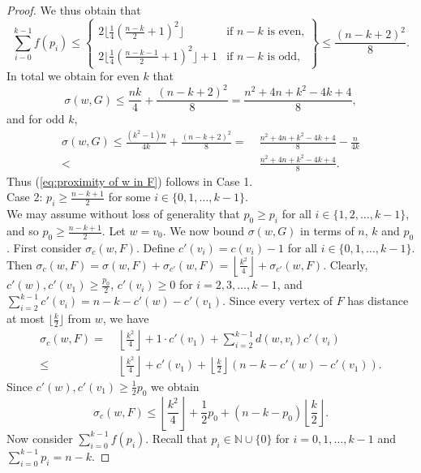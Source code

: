 \documentclass[a4paper,11pt]{article}
\numberwithin{equation}{theorem}
\begin{document}
\begin{proof}
We thus obtain that
\[ \sum_{i-0}^{k-1} f(p_i)  \leq 
   \left\{ \begin{array}{cc}
  2 \lfloor \frac{1}{4}(\frac{n-k}{2}+1)^2 \rfloor & 
  \textrm{if $n-k$ is even,} \\
 2 \lfloor \frac{1}{4}(\frac{n-k-1}{2}+1)^2 \rfloor + 1 & 
  \textrm{if $n-k$ is odd,} 
  \end{array} \right\} 
\leq \frac{(n-k+2)^2}{8}. \]
In total we obtain for even $k$ that
\[ \sigma(w,G) \leq \frac{nk}{4} 
 + \frac{(n-k+2)^2}{8}= 
\frac{n^2+4n + k^2 - 4k +4}{8},
\]
and for odd $k$, 
\begin{align*}
\sigma(w,G) \leq \frac{(k^2-1)n}{4k} 
 + \frac{(n-k+2)^2}{8}=&\; 
\frac{n^2+4n + k^2 - 4k +4}{8}-\frac{n}{4k}\\
<&\;\frac{n^2+4n + k^2 - 4k +4}{8}.
\end{align*}
Thus (\ref{eq:proximity of w in F}) follows in Case 1.\\[1mm]
{\sc Case 2:} $p_i \geq \frac{n-k+1}{2}$ for some $i \in \{0,1,\ldots,k-1\}$. \\
We may assume without loss of generality that $p_0 \geq p_i$ for all $i \in \{1,2,\ldots,k-1\}$, 
and so $p_0 \geq \frac{n-k+1}{2}$.  Let $w=v_0$. 
We now bound $\sigma(w,G)$ in terms of $n$, $k$ and $p_0$. 
First consider $\sigma_c(w,F)$. 
Define $c'(v_i)=c(v_i)-1$ for all $i \in \{0,1,\ldots,k-1\}$. Then 
$\sigma_c(w,F) = \sigma(w,F) + \sigma_{c'}(w,F) = \left\lfloor \frac{k^2}{4} \right\rfloor + \sigma_{c'}(w,F)$. 
Clearly, $c'(w), c'(v_1) \geq \frac{p_0}{2}$, $c'(v_i) \geq 0$ for $i=2,3,\ldots,k-1$, and 
$\sum_{i=2}^{k-1} c'(v_i) = n-k-c'(w) - c'(v_1)$. Since every vertex of $F$ has distance at most 
$\lfloor \frac{k}{2} \rfloor$ from $w$, we have
\begin{align*}
\sigma_c(w, F) =&\;  \left\lfloor \frac{k^2}{4} \right\rfloor 
        +  1 \cdot c'(v_1) +\sum_{i=2}^{k-1} d(w,v_i) c'(v_i) \\
         \leq&\; \left\lfloor \frac{k^2}{4} \right\rfloor + c'(v_1) + \left\lfloor \frac{k}{2} \right\rfloor (n-k-c'(w) -c'(v_1)).
\end{align*}
Since $c'(w), c'(v_1) \geq \frac{1}{2}p_0$ we obtain 
\begin{equation} \label{eq:outerplanar-case2-1} 
\sigma_c(w, F) \leq  \left\lfloor \frac{k^2}{4} \right\rfloor + \frac{1}{2}p_0 + (n-k-p_0)  \left\lfloor \frac{k}{2} \right\rfloor. 
\end{equation}           
Now consider $\sum_{i=0}^{k-1} f(p_i)$. 
Recall that $p_i \in \mathbb{N}\cup \{0\}$ for $i=0,1,\ldots,k-1$ and $\sum_{i=0}^{k-1} p_i = n-k$. 

\end{proof}
\end{document}
